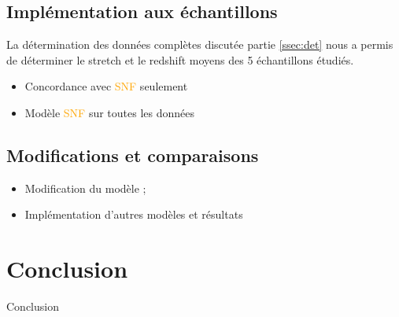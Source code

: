 \documentclass[a4paper, 12pt, svgnames]{article}
\begin{document}
\subsection{Implémentation aux échantillons}\label{ssec:surveys}
La détermination des données complètes discutée partie \ref{ssec:det} nous a
permis de déterminer le stretch et le redshift moyens des 5 échantillons
étudiés. 
\begin{itemize}
    \item Concordance avec \textcolor{orange}{SNF} seulement
    \item Modèle \textcolor{orange}{SNF} sur toutes les données
\end{itemize}

\subsection{Modifications et comparaisons}
\begin{itemize}
    \item Modification du modèle ;
    \item Implémentation d'autres modèles et résultats
\end{itemize}

\section{Conclusion}
Conclusion

%


\end{document}

